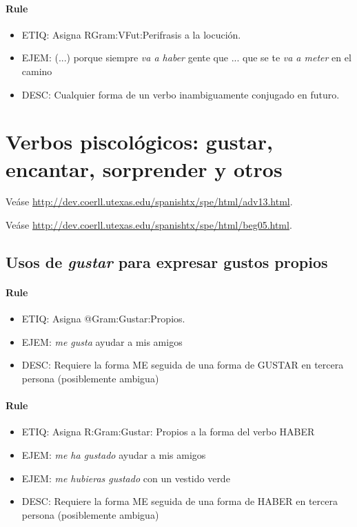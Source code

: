 \documentclass[11pt]{report}
\begin{document}
\paragraph*{Rule}
\begin{itemize}
\item ETIQ: Asigna RGram:VFut:Perifrasis a la locución.
\item EJEM: (...) porque siempre \emph{va a haber} gente que ... que se te \emph{va a meter} en el camino
\item DESC: Cualquier forma de un verbo inambiguamente conjugado en futuro.
\end{itemize}

\section{Verbos piscológicos: gustar, encantar, sorprender y otros}
Veáse \url{http://dev.coerll.utexas.edu/spanishtx/spe/html/adv13.html}.

Veáse \url{http://dev.coerll.utexas.edu/spanishtx/spe/html/beg05.html}.

\subsection{Usos de \emph{gustar} para expresar gustos propios}
\paragraph*{Rule}
\begin{itemize}
\item ETIQ: Asigna @Gram:Gustar:Propios.
\item EJEM: \emph{me gusta} ayudar a mis amigos 
\item DESC: Requiere la forma ME seguida de una forma de GUSTAR en tercera persona (posiblemente ambigua)
\end{itemize}

\paragraph*{Rule}
\begin{itemize}
\item ETIQ: Asigna R:Gram:Gustar: Propios a la forma del verbo HABER
\item EJEM: \emph{me ha gustado} ayudar a mis amigos 
\item EJEM: \emph{me hubieras gustado} con un vestido verde 
\item DESC: Requiere la forma ME seguida de una forma de HABER en tercera persona (posiblemente ambigua)
\end{itemize}
\end{document}
